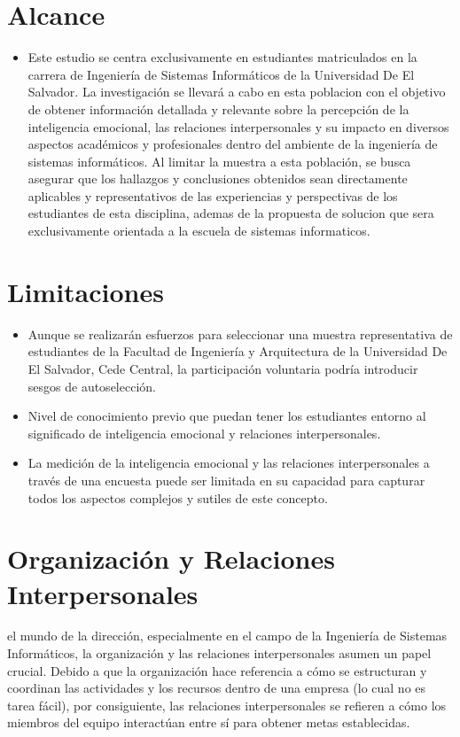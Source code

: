 \documentclass[journal]{IEEEtran}
\begin{document}
\section{Alcance}
\begin{itemize}
	\item Este estudio se centra exclusivamente en estudiantes matriculados en la carrera de Ingeniería de Sistemas Informáticos de la Universidad De El Salvador. La investigación se llevará a cabo en esta poblacion con el objetivo de obtener información detallada y relevante sobre la percepción de la inteligencia emocional, las relaciones interpersonales  y su impacto en diversos aspectos académicos y profesionales dentro del ambiente de la ingeniería de sistemas informáticos. Al limitar la muestra a esta población, se busca asegurar que los hallazgos y conclusiones obtenidos sean directamente aplicables y representativos de las experiencias y perspectivas de los estudiantes de esta disciplina, ademas de la propuesta de solucion que sera exclusivamente orientada a la escuela de sistemas informaticos.
\end{itemize}

\section{Limitaciones}
\begin{itemize}
	\item Aunque se realizarán esfuerzos para seleccionar una muestra representativa de estudiantes de la Facultad de Ingeniería y Arquitectura de la Universidad De El Salvador, Cede Central, la participación voluntaria podría introducir sesgos de autoselección.
	\item Nivel de conocimiento previo que puedan tener los estudiantes entorno al significado de inteligencia emocional y relaciones interpersonales.
	\item La medición de la inteligencia emocional y las relaciones interpersonales a través de una encuesta puede ser limitada en su capacidad para capturar todos los aspectos complejos y sutiles de este concepto.
	
\end{itemize}
\section{Organización y Relaciones Interpersonales}
 el mundo de la dirección, especialmente en el campo de la Ingeniería de Sistemas Informáticos, la organización y las relaciones interpersonales asumen un papel crucial. Debido a que la organización hace referencia a cómo se estructuran y coordinan las actividades y los recursos dentro de una empresa (lo cual no es tarea fácil), por consiguiente, las relaciones interpersonales se refieren a cómo los miembros del equipo interactúan entre sí para obtener metas establecidas.
\end{document}
